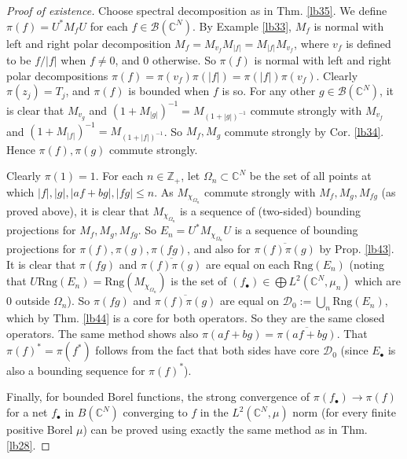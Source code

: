 \documentclass[12pt,b5paper,notitlepage]{article}
\theoremstyle{definition}
\theoremstyle{plain}
\newcommand{\ovl}{\overline}
\newcommand{\Dom}{\scr D}
\newcommand{\scr}{\mathscr}
\newcommand{\blt}{\bullet}
\newcommand{\Cbb}{\mathbb C}
\newcommand{\Zbb}{\mathbb Z}
\newcommand{\Rng}{\mathrm{Rng}}
\numberwithin{equation}{section}
\begin{document}
\begin{proof}[Proof of existence]
Choose spectral decomposition as in Thm. \ref{lb35}. We define $\pi(f)=U^*M_fU$ for each $f\in\scr B(\Cbb^N)$.	By Example \ref{lb33}, $M_f$ is normal with left  and right polar decomposition $M_f=M_{v_f}M_{|f|}=M_{|f|}M_{v_f}$, where $v_f$ is defined to be $f/|f|$ when $f\neq 0$, and $0$ otherwise. So $\pi(f)$ is normal with left and right polar decompositions $\pi(f)=\pi(v_f)\pi(|f|)=\pi(|f|)\pi(v_f)$. Clearly $\pi(z_j)=T_j$, and $\pi(f)$ is bounded when $f$ is so. For any other $g\in\scr B(\Cbb^N)$, it is clear that $M_{v_g}$ and $(1+M_{|g|})^{-1}=M_{(1+|g|)^{-1}}$ commute strongly with $M_{v_f}$ and $(1+M_{|f|})^{-1}=M_{(1+|f|)^{-1}}$. So $M_f,M_g$ commute strongly by Cor. \ref{lb34}. Hence $\pi(f),\pi(g)$ commute strongly.

Clearly $\pi(1)=1$. For each $n\in\Zbb_+$, let $\Omega_n\subset\Cbb^N$ be the set of all points at which $|f|,|g|,|af+bg|,|fg|\leq n$. As $M_{\chi_{\Omega_n}}$ commute strongly with $M_f,M_g,M_{fg}$ (as proved above), it is clear that $M_{\chi_{\Omega_n}}$ is a sequence of (two-sided) bounding projections for $M_f,M_g,M_{fg}$. So $E_n=U^*M_{\chi_{\Omega_n}}U$ is a sequence of bounding projections for $\pi(f),\pi(g),\pi(fg)$, and also for $\ovl{\pi(f)\pi(g)}$ by Prop. \ref{lb43}. It is clear that $\pi(fg)$ and $\ovl{\pi(f)\pi(g)}$ are equal on each $\Rng(E_n)$ (noting that $U\Rng(E_n)=\Rng(M_{\chi_{\Omega_n}})$ is the set of $(f_\blt)\in \bigoplus L^2(\Cbb^N,\mu_n)$ which are $0$ outside $\Omega_n$). So $\pi(fg)$ and $\ovl{\pi(f)\pi(g)}$ are equal on $\Dom_0:=\bigcup_n\Rng(E_n)$, which by Thm. \ref{lb44} is a core for both operators. So they are the same closed operators. The same method shows also $\pi(af+bg)=\ovl{\pi(af+bg)}$. That $\pi(f)^*=\pi(f^*)$ follows from the fact that both sides have core $\Dom_0$ (since $E_\blt$ is also a bounding sequence for $\pi(f)^*$).

Finally, for bounded Borel functions, the strong convergence of $\pi(f_\blt)\rightarrow\pi(f)$ for a net $f_\blt$ in $B(\Cbb^N)$ converging to $f$ in the $L^2(\Cbb^N,\mu)$ norm (for every finite positive Borel $\mu$) can be proved using exactly the same method as in Thm. \ref{lb28}.
\end{proof}	
\end{document}

